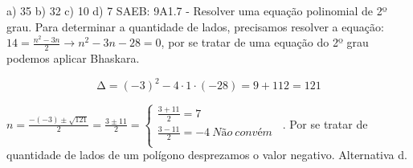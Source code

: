 \begin{escolha}
\begin{boxmedio}
\begin{boxmedio}
{\begin{boxpeq}
\begin{boxpeq}
{\begin{boxpeq}
\begin{boxmedio}
\begin{boxmedio}
\begin{boxpeq}
\begin{boxmedio}
\begin{boxpeq}
\begin{boxpeq}
\begin{boxpeq}
\begin{boxpeq}
\begin{boxmedio}
{\begin{boxmedio}
\begin{boxmedio}
\begin{boxpeq}
\begin{boxmedio}
\begin{boxpeq}
\begin{boxpeq}
\begin{boxpeq}
\begin{escolha}
{\begin{boxmedio}
\begin{boxpeq}
\begin{boxpeq}
\begin{boxpeq}
\begin{boxpeq}
\begin{boxpeq}
\begin{boxmedio}
\begin{boxpeq}
\begin{boxpeq}
\begin{boxpeq}
{\begin{boxpeq}
\begin{boxmedio}
\begin{boxpeq}
\begin{boxpeq}
\begin{boxpeq}
{\begin{boxpeq}
\begin{boxmedio}
{\begin{boxpeq}
\begin{boxpeq}
\begin{boxmedio}
\begin{boxmedio}
\begin{boxpeq}
\begin{boxpeq}
{\begin{boxpeq}
\begin{boxpeq}
\begin{boxpeq}
\begin{boxpeq}
\begin{boxpeq}
\begin{escolha}
\begin{escolha}
{\begin{boxmedio}
\begin{boxpeq}
\begin{q°}
\begin{boxmedio}
\begin{boxpeq}
\begin{boxpeq}
\begin{boxmedio}
\begin{boxmedio}
\begin{boxmedio}
\begin{boxmedio}
{\begin{escolha}
\begin{escolha}
\begin{escolha}
\begin{escolha}
\begin{escolha}
\begin{escolha}
{a) 35 b) 32 c) 10 d) 7 SAEB: 9A1.7 - Resolver uma equação polinomial de
2º grau. Para determinar a quantidade de lados, precisamos resolver a
equação: $14 = \frac{n^{2} - 3n}{2} \rightarrow n^{2} - 3n - 28 = 0$,
por se tratar de uma equação do 2º grau podemos aplicar Bhaskara.

\[\mathrm{\Delta} = \left( - 3 \right)^{2} - 4 \cdot 1 \cdot \left( - 28 \right) = 9 + 112 = 121\]

$n = \frac{- ( - 3) \pm \sqrt{121}}{2} = \frac{3 \pm 11}{2} = \left\{ \begin{matrix} \frac{3 + 11}{2} = 7\ \ \ \ \ \ \ \ \ \ \ \ \ \ \ \ \ \ \ \ \ \ \ \ \ \ \ \ \ \  \\ \frac{3 - 11}{2} = - 4\ Não\ convém \\ \end{matrix} \right.\ $.
Por se tratar de quantidade de lados de um polígono desprezamos o valor
negativo. Alternativa d.

}
\end{escolha}
\end{escolha}
\end{escolha}
\end{escolha}
\end{escolha}
\end{escolha}}
\end{boxmedio}
\end{boxmedio}
\end{boxmedio}
\end{boxmedio}
\end{boxpeq}
\end{boxpeq}
\end{boxmedio}
\end{q°}
\end{boxpeq}
\end{boxmedio}}
\end{escolha}
\end{escolha}
\end{boxpeq}
\end{boxpeq}
\end{boxpeq}
\end{boxpeq}
\end{boxpeq}}
\end{boxpeq}
\end{boxpeq}
\end{boxmedio}
\end{boxmedio}
\end{boxpeq}
\end{boxpeq}}
\end{boxmedio}
\end{boxpeq}}
\end{boxpeq}
\end{boxpeq}
\end{boxpeq}
\end{boxmedio}
\end{boxpeq}}
\end{boxpeq}
\end{boxpeq}
\end{boxpeq}
\end{boxmedio}
\end{boxpeq}
\end{boxpeq}
\end{boxpeq}
\end{boxpeq}
\end{boxpeq}
\end{boxmedio}}
\end{escolha}
\end{boxpeq}
\end{boxpeq}
\end{boxpeq}
\end{boxmedio}
\end{boxpeq}
\end{boxmedio}
\end{boxmedio}}
\end{boxmedio}
\end{boxpeq}
\end{boxpeq}
\end{boxpeq}
\end{boxpeq}
\end{boxmedio}
\end{boxpeq}
\end{boxmedio}
\end{boxmedio}
\end{boxpeq}}
\end{boxpeq}
\end{boxpeq}}
\end{boxmedio}
\end{boxmedio}
\end{escolha}
